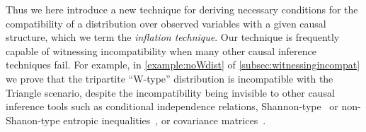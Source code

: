 

Thus we here introduce a new technique for deriving necessary conditions for the compatibility of a distribution over observed variables with a given causal structure, which we term the {\em inflation technique}. Our technique is frequently capable of witnessing incompatibility when many other causal inference techniques fail. For example, in \cref{example:noWdist} of \cref{subsec:witnessingincompat} we prove that the tripartite ``W-type'' distribution is incompatible with the Triangle scenario, despite the incompatibility being invisible to other causal inference tools such as conditional independence relations, Shannon-type~\cite{fritz2013marginal,chaves2014novel,chaves2014informationinference} or non-Shanon-type entropic inequalities~\cite{weilenmann2016entropic}, or covariance matrices~\cite{kela2016covariance}.


